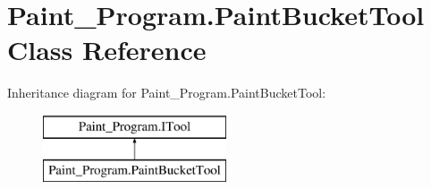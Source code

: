 \hypertarget{class_paint___program_1_1_paint_bucket_tool}{}\section{Paint\+\_\+\+Program.\+Paint\+Bucket\+Tool Class Reference}
\label{class_paint___program_1_1_paint_bucket_tool}
Inheritance diagram for Paint\+\_\+\+Program.\+Paint\+Bucket\+Tool\+:\begin{figure}[H]
\begin{center}
\leavevmode
\includegraphics[height=2.000000cm]{class_paint___program_1_1_paint_bucket_tool}
\end{center}
\end{figure}
